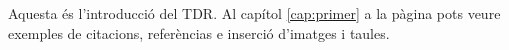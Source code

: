 Aquesta és l'introducció del TDR. Al capítol \ref{cap:primer} a la pàgina \pageref{cap:primer} pots veure exemples de citacions, referèncias e inserció d'imatges i taules.